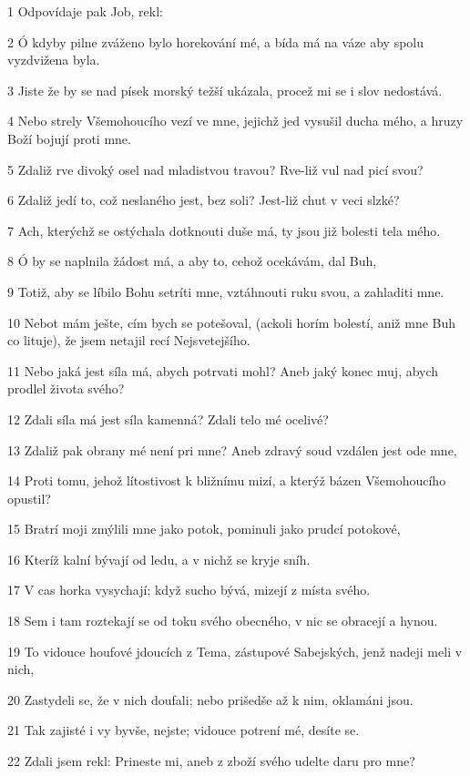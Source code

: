 \par 1 Odpovídaje pak Job, rekl:
\par 2 Ó kdyby pilne zváženo bylo horekování mé, a bída má na váze aby spolu vyzdvižena byla.
\par 3 Jiste že by se nad písek morský težší ukázala, procež mi se i slov nedostává.
\par 4 Nebo strely Všemohoucího vezí ve mne, jejichž jed vysušil ducha mého, a hruzy Boží bojují proti mne.
\par 5 Zdaliž rve divoký osel nad mladistvou travou? Rve-liž vul nad picí svou?
\par 6 Zdaliž jedí to, což neslaného jest, bez soli? Jest-liž chut v veci slzké?
\par 7 Ach, kterýchž se ostýchala dotknouti duše má, ty jsou již bolesti tela mého.
\par 8 Ó by se naplnila žádost má, a aby to, cehož ocekávám, dal Buh,
\par 9 Totiž, aby se líbilo Bohu setríti mne, vztáhnouti ruku svou, a zahladiti mne.
\par 10 Nebot mám ješte, cím bych se potešoval, (ackoli horím bolestí, aniž mne Buh co lituje), že jsem netajil recí Nejsvetejšího.
\par 11 Nebo jaká jest síla má, abych potrvati mohl? Aneb jaký konec muj, abych prodlel života svého?
\par 12 Zdali síla má jest síla kamenná? Zdali telo mé ocelivé?
\par 13 Zdaliž pak obrany mé není pri mne? Aneb zdravý soud vzdálen jest ode mne,
\par 14 Proti tomu, jehož lítostivost k bližnímu mizí, a kterýž bázen Všemohoucího opustil?
\par 15 Bratrí moji zmýlili mne jako potok, pominuli jako prudcí potokové,
\par 16 Kteríž kalní bývají od ledu, a v nichž se kryje sníh.
\par 17 V cas horka vysychají; když sucho bývá, mizejí z místa svého.
\par 18 Sem i tam roztekají se od toku svého obecného, v nic se obracejí a hynou.
\par 19 To vidouce houfové jdoucích z Tema, zástupové Sabejských, jenž nadeji meli v nich,
\par 20 Zastydeli se, že v nich doufali; nebo prišedše až k nim, oklamáni jsou.
\par 21 Tak zajisté i vy byvše, nejste; vidouce potrení mé, desíte se.
\par 22 Zdali jsem rekl: Prineste mi, aneb z zboží svého udelte daru pro mne?
